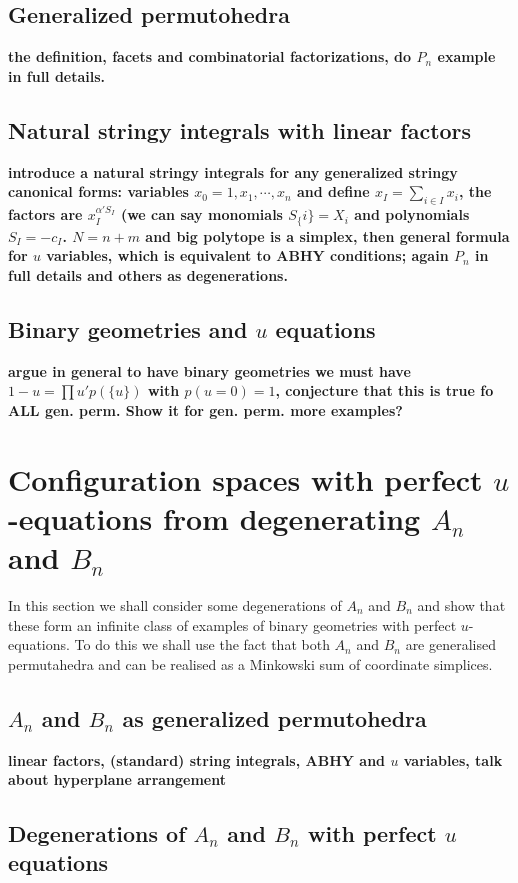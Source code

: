 \documentclass[hidelinks,12pt]{article}
\begin{document}
\subsection{Generalized permutohedra} {\bf the definition, facets and combinatorial factorizations, do $P_n$ example in full details.}

\subsection{Natural stringy integrals with linear factors} 

{\bf introduce a natural stringy integrals for any generalized stringy canonical forms: variables $x_0=1, x_1, \cdots, x_n$ and define $x_I=\sum_{i \in I} x_i$, the factors are $x_I^{\alpha' S_I}$ (we can say monomials $S_\{i\}=X_i$ and polynomials $S_I=-c_I$. $N=n+m$ and big polytope is a simplex, then general formula for $u$ variables, which is equivalent to ABHY conditions; again $P_n$ in full details and others as degenerations.}

\subsection{Binary geometries and $u$ equations}

{\bf argue in general to have binary geometries we must have $1-u=\prod u' p(\{u\})$ with $p(u=0)=1$, conjecture that this is true fo ALL gen. perm. Show it for gen. perm. more examples?}

\section{Configuration spaces with perfect $u$-equations from degenerating $A_n$ and $B_n$}
In this section we shall consider some degenerations of $A_n$ and $B_n$ and show that these form an infinite class of examples of binary geometries with perfect $u$-equations. To do this we shall use the fact that both $A_n$ and $B_n$ are generalised permutahedra and can be realised as a Minkowski sum of coordinate simplices. 

\subsection{$A_n$ and $B_n$ as generalized permutohedra} 

{\bf linear factors, (standard) string integrals, ABHY and $u$ variables, talk about hyperplane arrangement}

\subsection{Degenerations of $A_n$ and $B_n$ with perfect $u$ equations} 
\end{document}
